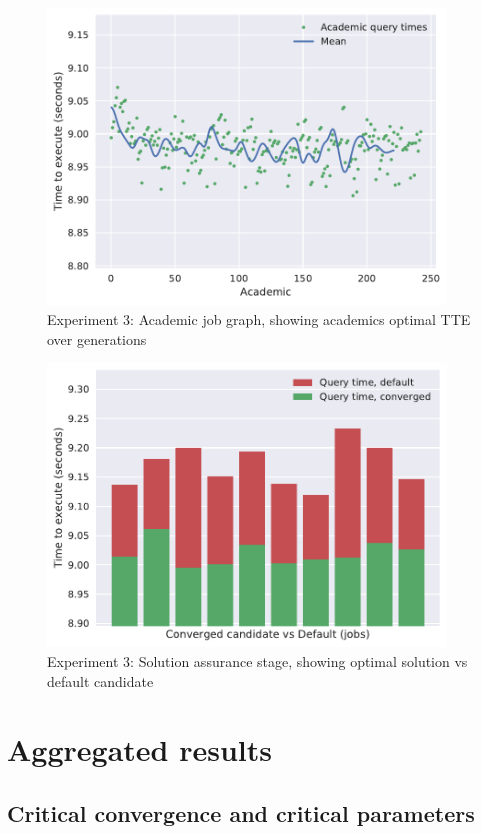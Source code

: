 \documentclass[a4paper,english]{report}
\begin{document}
	\begin{figure}[H]
		\centering
		\includegraphics[width=300pt]{runlogs/final9/3}
		\caption{Experiment 3: Academic job graph, showing academics optimal TTE over generations}
		\label{fig:final33}
	\end{figure}
	\begin{figure}[H]
		\centering
		\includegraphics[width=300pt]{runlogs/final9/4}
		\caption{Experiment 3: Solution assurance stage, showing optimal solution vs default candidate}
		\label{fig:final34}
	\end{figure}
	\clearpage
	\section{Aggregated results}
	
	\subsection{Critical convergence and critical parameters}
\end{document}
